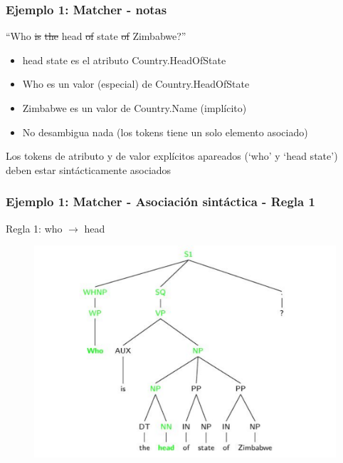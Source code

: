 \begin{frame}[t]
\frametitle{Ejemplo 1: Matcher - notas}
\Large{``{\color{blue}Who} \st{is} \st{the} {\color{blue}head} \st{of} {\color{blue}state} \st{of} {\color{red}Zimbabwe}?''}
\normalsize{
\begin{itemize}
  \item {\color{blue}head state} es el atributo {\color{blue}Country.HeadOfState}
  \item {\color{blue}Who} es un valor (especial) de {\color{blue}Country.HeadOfState}
  \item {\color{red}Zimbabwe} es un valor de Country.Name ({\color{red}implícito})
  \item No desambigua nada (los tokens tiene un solo elemento asociado)
\end{itemize}
}
\bigskip
Los tokens de atributo y de valor explícitos apareados (`who' y `head state') deben estar sintácticamente asociados

\end{frame}
\begin{frame}[t]
\frametitle{Ejemplo 1: Matcher - Asociación sintáctica - Regla 1}
\Large{Regla 1: who $\rightarrow$ head}
\begin{center}
\begin{figure}
  \centering
    \includegraphics[scale=.5]{graficos/presentacion/ejemplo-charniak-2}
\end{figure}

\end{center}
\end{frame}

